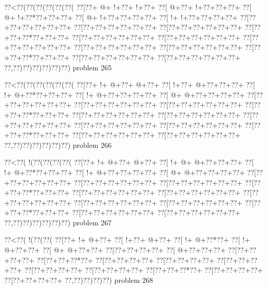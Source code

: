 \vbox{\vbox{\goo
\0??<\0??(\0??(\0??(\0??(\0??(\0??(
\0??[\0??+\- @+\- !+\0??+\- !+\0??+
\0??[\- @+\0??+\- !+\0??+\0??+\0??+
\0??[\- @+\- !+\0??*\0??+\0??+\0??+
\0??[\- @+\- !+\0??+\0??+\0??+\0??+
\0??[\- !+\- !+\0??+\0??+\0??+\0??+
\0??[\0??+\0??+\0??+\0??+\0??+\0??+
\0??[\0??+\0??+\0??+\0??+\0??+\0??+
\0??[\0??+\0??+\0??+\0??+\0??+\0??+
\0??[\0??+\0??+\0??*\0??+\0??+\0??+
\0??[\0??+\0??+\0??+\0??+\0??+\0??+
\0??[\0??+\0??+\0??+\0??+\0??+\0??+
\0??[\0??+\0??+\0??+\0??+\0??+\0??+
\0??[\0??+\0??+\0??+\0??+\0??+\0??+
\0??[\0??+\0??+\0??+\0??+\0??+\0??+
\0??[\0??+\0??+\0??*\0??+\0??+\0??+
\0??[\0??+\0??+\0??+\0??+\0??+\0??+
\0??[\0??+\0??+\0??+\0??+\0??+\0??+
\0??,\0??)\0??)\0??)\0??)\0??)\0??)
}
\hfil problem 265\hfil\break
}

\vbox{\vbox{\goo
\0??<\0??(\0??(\0??(\0??(\0??(\0??(
\0??[\0??+\- !+\- @+\0??+\- @+\0??+
\0??[\- !+\0??+\- @+\0??+\0??+\0??+
\0??[\- !+\- @+\0??*\0??+\0??+\0??+
\0??[\- !+\- @+\0??+\0??+\0??+\0??+
\0??[\- @+\- @+\0??+\0??+\0??+\0??+
\0??[\0??+\0??+\0??+\0??+\0??+\0??+
\0??[\0??+\0??+\0??+\0??+\0??+\0??+
\0??[\0??+\0??+\0??+\0??+\0??+\0??+
\0??[\0??+\0??+\0??*\0??+\0??+\0??+
\0??[\0??+\0??+\0??+\0??+\0??+\0??+
\0??[\0??+\0??+\0??+\0??+\0??+\0??+
\0??[\0??+\0??+\0??+\0??+\0??+\0??+
\0??[\0??+\0??+\0??+\0??+\0??+\0??+
\0??[\0??+\0??+\0??+\0??+\0??+\0??+
\0??[\0??+\0??+\0??*\0??+\0??+\0??+
\0??[\0??+\0??+\0??+\0??+\0??+\0??+
\0??[\0??+\0??+\0??+\0??+\0??+\0??+
\0??,\0??)\0??)\0??)\0??)\0??)\0??)
}
\hfil problem 266\hfil\break
}

\vbox{\vbox{\goo
\0??<\0??(\- !(\0??(\0??(\0??(\0??(
\0??[\0??+\- !+\- @+\0??+\- @+\0??+
\0??[\- !+\- @+\- @+\0??+\0??+\0??+
\0??[\- !+\- @+\0??*\0??+\0??+\0??+
\0??[\- !+\- @+\0??+\0??+\0??+\0??+
\0??[\- @+\- @+\0??+\0??+\0??+\0??+
\0??[\0??+\0??+\0??+\0??+\0??+\0??+
\0??[\0??+\0??+\0??+\0??+\0??+\0??+
\0??[\0??+\0??+\0??+\0??+\0??+\0??+
\0??[\0??+\0??+\0??*\0??+\0??+\0??+
\0??[\0??+\0??+\0??+\0??+\0??+\0??+
\0??[\0??+\0??+\0??+\0??+\0??+\0??+
\0??[\0??+\0??+\0??+\0??+\0??+\0??+
\0??[\0??+\0??+\0??+\0??+\0??+\0??+
\0??[\0??+\0??+\0??+\0??+\0??+\0??+
\0??[\0??+\0??+\0??*\0??+\0??+\0??+
\0??[\0??+\0??+\0??+\0??+\0??+\0??+
\0??[\0??+\0??+\0??+\0??+\0??+\0??+
\0??,\0??)\0??)\0??)\0??)\0??)\0??)
}
\hfil problem 267\hfil\break
}

\vbox{\vbox{\goo
\0??<\0??(\- !(\0??(\0??(
\0??[\0??+\- !+\- @+\0??+
\0??[\- !+\0??+\- @+\0??+
\0??[\- !+\- @+\0??*\0??+
\0??[\- !+\- @+\0??+\0??+
\0??[\- @+\- @+\0??+\0??+
\0??[\0??+\0??+\0??+\0??+
\0??[\- @+\0??+\0??+\0??+
\0??[\0??+\0??+\0??+\0??+
\0??[\0??+\0??+\0??*\0??+
\0??[\0??+\0??+\0??+\0??+
\0??[\0??+\0??+\0??+\0??+
\0??[\0??+\0??+\0??+\0??+
\0??[\0??+\0??+\0??+\0??+
\0??[\0??+\0??+\0??+\0??+
\0??[\0??+\0??+\0??*\0??+
\0??[\0??+\0??+\0??+\0??+
\0??[\0??+\0??+\0??+\0??+
\0??,\0??)\0??)\0??)\0??)
}
\hfil problem 268\hfil\break
}

